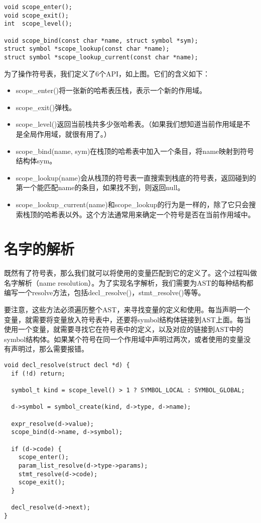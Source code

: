 \documentclass[cn,11pt,chinese]{elegantbook}
\begin{document}
\begin{verbatim}
void scope_enter();
void scope_exit();
int  scope_level();

void scope_bind(const char *name, struct symbol *sym);
struct symbol *scope_lookup(const char *name);
struct symbol *scope_lookup_current(const char *name);
\end{verbatim}

为了操作符号表，我们定义了6个API，如上图。它们的含义如下：

\begin{itemize}
  \item scope\_enter()将一张新的哈希表压栈，表示一个新的作用域。
  \item scope\_exit()弹栈。
  \item scope\_level()返回当前栈共多少张哈希表。（如果我们想知道当前作用域是不是全局作用域，就很有用了。）
  \item scope\_bind(name, sym)在栈顶的哈希表中加入一个条目，将name映射到符号结构体sym。
  \item scope\_lookup(name)会从栈顶的符号表一直搜索到栈底的符号表，返回碰到的第一个能匹配name的条目，如果找不到，则返回null。
  \item scope\_lookup\_current(name)和scope\_lookup的行为是一样的，除了它只会搜索栈顶的哈希表以外。这个方法通常用来确定一个符号是否在当前作用域中。
\end{itemize}

\section{名字的解析}

既然有了符号表，那么我们就可以将使用的变量匹配到它的定义了。这个过程叫做名字解析（name resolution）。为了实现名字解析，我们需要为AST的每种结构都编写一个resolve方法，包括decl\_resolve()，stmt\_resolve()等等。

要注意，这些方法必须遍历整个AST，来寻找变量的定义和使用。每当声明一个变量，就需要将变量放入符号表中，还要将symbol结构体链接到AST上面。每当使用一个变量，就需要寻找它在符号表中的定义，以及对应的链接到AST中的symbol结构体。如果某个符号在同一个作用域中声明过两次，或者使用的变量没有声明过，那么需要报错。

\begin{verbatim}
void decl_resolve(struct decl *d) {
  if (!d) return;
    
  symbol_t kind = scope_level() > 1 ? SYMBOL_LOCAL : SYMBOL_GLOBAL;
  
  d->symbol = symbol_create(kind, d->type, d->name);
    
  expr_resolve(d->value);
  scope_bind(d->name, d->symbol);
    
  if (d->code) {
    scope_enter();
    param_list_resolve(d->type->params);
    stmt_resolve(d->code);
    scope_exit();
  }
    
  decl_resolve(d->next);
}
\end{verbatim}
\end{document}
